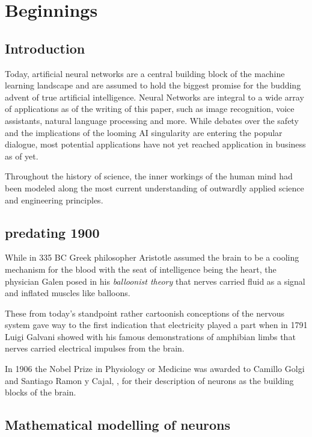 \chapter{Beginnings}

\section{Introduction}

Today, artificial neural networks are a central building block of the machine learning landscape and are assumed to hold the biggest promise for the budding advent of true artificial intelligence. Neural Networks are integral to a wide array of applications as of the writing of this paper, such as image recognition, voice assistants, natural language processing and more. While debates over the safety and the implications of the looming AI singularity are entering the popular dialogue, most potential applications have not yet reached application in business as of yet.



Throughout the history of science, the inner workings of the human mind had been modeled along the most current understanding of outwardly applied science and engineering principles.

\section{predating 1900}

While in 335 BC Greek philosopher Aristotle assumed the brain to be a cooling mechanism for the blood with the seat of intelligence being the heart, the physician Galen posed in his \textit{balloonist theory} that nerves carried fluid as a signal and inflated muscles like balloons.

These from today's standpoint rather cartoonish conceptions of the nervous system gave way to the first indication that electricity played a part when in 1791 Luigi Galvani showed with his famous demonstrations of amphibian limbs that nerves carried electrical impulses from the brain. 

In 1906 the Nobel Prize in Physiology or Medicine was awarded to Camillo Golgi and Santiago Ramon y Cajal, \cite{golgi}, for their description of neurons as the building blocks of the brain.

\section{Mathematical modelling of neurons}


